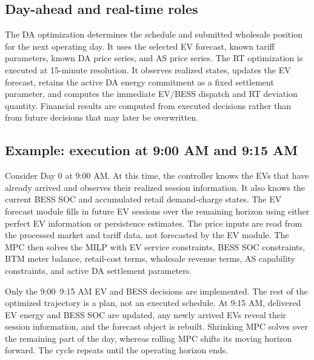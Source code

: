 \documentclass[final,5p,times]{elsarticle}
\begin{document}
\subsection{Day-ahead and real-time roles}
The DA optimization determines the schedule and submitted wholesale position for the next operating day. It uses the selected EV forecast, known tariff parameters, known DA price series, and AS price series. The RT optimization is executed at 15-minute resolution. It observes realized states, updates the EV forecast, retains the active DA energy commitment as a fixed settlement parameter, and computes the immediate EV/BESS dispatch and RT deviation quantity. Financial results are computed from executed decisions rather than from future decisions that may later be overwritten.

\subsection{Example: execution at 9:00 AM and 9:15 AM}
Consider Day 0 at 9:00 AM. At this time, the controller knows the EVs that have already arrived and observes their realized session information. It also knows the current BESS SOC and accumulated retail demand-charge states. The EV forecast module fills in future EV sessions over the remaining horizon using either perfect EV information or persistence estimates. The price inputs are read from the processed market and tariff data, not forecasted by the EV module. The MPC then solves the MILP with EV service constraints, BESS SOC constraints, BTM meter balance, retail-cost terms, wholesale revenue terms, AS capability constraints, and active DA settlement parameters.

Only the 9:00--9:15 AM EV and BESS decisions are implemented. The rest of the optimized trajectory is a plan, not an executed schedule. At 9:15 AM, delivered EV energy and BESS SOC are updated, any newly arrived EVs reveal their session information, and the forecast object is rebuilt. Shrinking MPC solves over the remaining part of the day, whereas rolling MPC shifts its moving horizon forward. The cycle repeats until the operating horizon ends.
\end{document}
